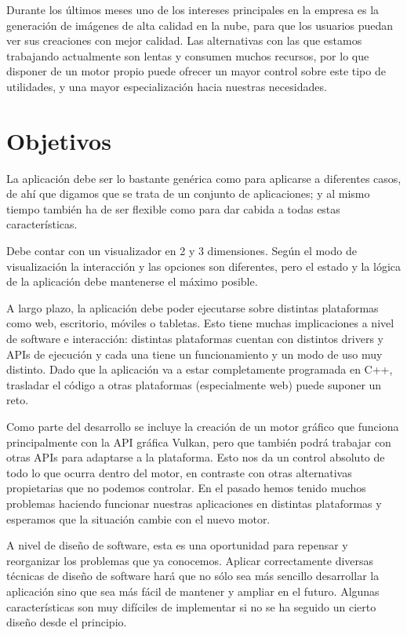 Durante los últimos meses uno de los intereses principales en la empresa es la generación de imágenes de alta calidad en la nube, para que los usuarios puedan ver sus creaciones con mejor calidad. Las alternativas con las que estamos trabajando actualmente son lentas y consumen muchos recursos, por lo que disponer de un motor propio puede ofrecer un mayor control sobre este tipo de utilidades, y una mayor especialización hacia nuestras necesidades.

\section{Objetivos}

La aplicación debe ser lo bastante genérica como para aplicarse a diferentes casos, de ahí que digamos que se trata de un conjunto de aplicaciones; y al mismo tiempo también ha de ser flexible como para dar cabida a todas estas características.

Debe contar con un visualizador en 2 y 3 dimensiones. Según el modo de visualización la interacción y las opciones son diferentes, pero el estado y la lógica de la aplicación debe mantenerse el máximo posible.

A largo plazo, la aplicación debe poder ejecutarse sobre distintas plataformas como web, escritorio, móviles o tabletas. Esto tiene muchas implicaciones a nivel de software e interacción: distintas plataformas cuentan con distintos drivers y APIs de ejecución y cada una tiene un funcionamiento y un modo de uso muy distinto. Dado que la aplicación va a estar completamente programada en C++, trasladar el código a otras plataformas (especialmente web) puede suponer un reto.

Como parte del desarrollo se incluye la creación de un motor gráfico que funciona principalmente con la API gráfica Vulkan, pero que también podrá trabajar con otras APIs para adaptarse a la plataforma. Esto nos da un control absoluto de todo lo que ocurra dentro del motor, en contraste con otras alternativas propietarias que no podemos controlar. En el pasado hemos tenido muchos problemas haciendo funcionar nuestras aplicaciones en distintas plataformas y esperamos que la situación cambie con el nuevo motor.

A nivel de diseño de software, esta es una oportunidad para repensar y reorganizar los problemas que ya conocemos. Aplicar correctamente diversas técnicas de diseño de software hará que no sólo sea más sencillo desarrollar la aplicación sino que sea más fácil de mantener y ampliar en el futuro. Algunas características son muy difíciles de implementar si no se ha seguido un cierto diseño desde el principio.

